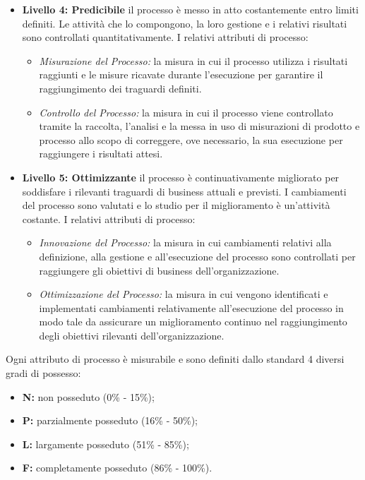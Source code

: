 \begin{itemize}
		\item \textbf{Livello 4: Predicibile} il processo è messo in atto costantemente entro limiti definiti. Le attività che lo compongono, la loro gestione e i relativi risultati sono controllati quantitativamente.
I relativi attributi di processo:
			\begin{itemize}
				\item \emph{Misurazione del Processo:} la misura in cui il processo utilizza i risultati raggiunti e le misure ricavate durante l'esecuzione per garantire il raggiungimento dei traguardi definiti.
				\item \emph{Controllo del Processo:} la misura in cui il processo viene controllato tramite la raccolta, l'analisi e la messa in uso di misurazioni di prodotto e processo allo scopo di correggere, ove necessario, la sua esecuzione per raggiungere i risultati attesi.	
			\end{itemize}

		\item \textbf{Livello 5: Ottimizzante} il processo è continuativamente migliorato per soddisfare i rilevanti traguardi di business attuali e previsti. I cambiamenti del processo sono valutati e lo studio per il miglioramento è un'attività costante.
I relativi attributi di processo:
			\begin{itemize}
				\item \emph{Innovazione del Processo:} la misura in cui cambiamenti relativi alla definizione, alla gestione e all'esecuzione del processo sono controllati per raggiungere gli obiettivi di business dell'organizzazione.
				\item \emph{Ottimizzazione del Processo:} la misura in cui vengono identificati e implementati cambiamenti relativamente all'esecuzione del processo in modo tale da assicurare un miglioramento continuo nel raggiungimento degli obiettivi rilevanti dell'organizzazione.
			\end{itemize}
		\end{itemize}

Ogni attributo di processo è misurabile e sono definiti dallo standard 4 diversi gradi di possesso:
	\begin{itemize}
		\item \textbf{N:} non posseduto (0\% - 15\%);
		\item \textbf{P:} parzialmente posseduto (16\% - 50\%);
		\item \textbf{L:} largamente posseduto (51\% - 85\%);
		\item \textbf{F:} completamente posseduto (86\% - 100\%).
	\end{itemize}

